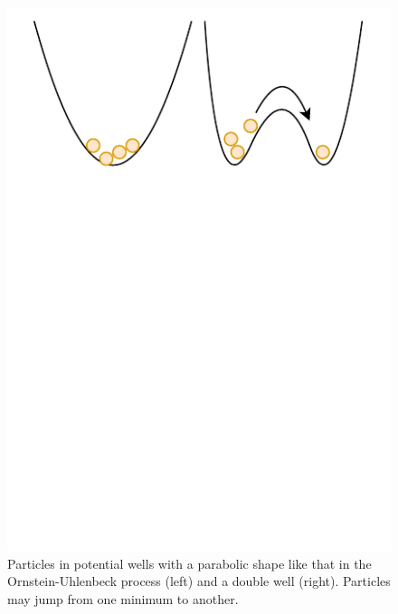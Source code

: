         \begin{figure}
            \centering
            \includegraphics[width=0.7\linewidth, trim={0 7cm 0 0}]{Figures/potwells}
            \caption[Particles in potential wells]{Particles in potential wells with a parabolic shape like that in the Ornstein-Uhlenbeck process (left) and a double well (right). Particles may jump from one minimum to another.}
            \label{fig:particlewells}
        \end{figure}
        
